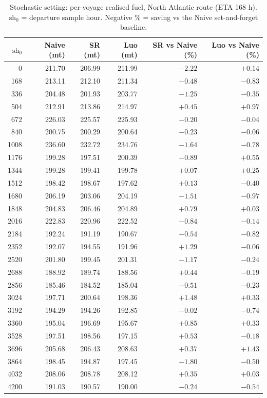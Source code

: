 \documentclass[review,authoryear]{elsarticle}
\begin{document}
\begin{table}[H]
\centering
\caption{Stochastic setting: per-voyage realised fuel, North Atlantic route (ETA 168 h). $\mathrm{sh}_0$ =
departure sample hour. Negative \% = saving vs the Naive set-and-forget baseline.}
\label{tab:stoch-r2}
\begin{tabular}{rrrrrr}
\toprule
$\mathrm{sh}_0$ & Naive (mt) & SR (mt) & Luo (mt) & SR vs Naive (\%) & Luo vs Naive (\%) \\
\midrule
0    & 211.70 & 206.99 & 211.99 & $-2.22$ & $+0.14$ \\
168  & 213.11 & 212.10 & 211.34 & $-0.48$ & $-0.83$ \\
336  & 204.48 & 201.93 & 203.77 & $-1.25$ & $-0.35$ \\
504  & 212.91 & 213.86 & 214.97 & $+0.45$ & $+0.97$ \\
672  & 226.03 & 225.57 & 225.93 & $-0.20$ & $-0.04$ \\
840  & 200.75 & 200.29 & 200.64 & $-0.23$ & $-0.06$ \\
1008 & 236.60 & 232.72 & 234.76 & $-1.64$ & $-0.78$ \\
1176 & 199.28 & 197.51 & 200.39 & $-0.89$ & $+0.55$ \\
1344 & 199.28 & 199.41 & 199.78 & $+0.07$ & $+0.25$ \\
1512 & 198.42 & 198.67 & 197.62 & $+0.13$ & $-0.40$ \\
1680 & 206.19 & 203.06 & 204.19 & $-1.51$ & $-0.97$ \\
1848 & 204.83 & 206.46 & 204.89 & $+0.79$ & $+0.03$ \\
2016 & 222.83 & 220.96 & 222.52 & $-0.84$ & $-0.14$ \\
2184 & 192.24 & 191.19 & 190.67 & $-0.54$ & $-0.82$ \\
2352 & 192.07 & 194.55 & 191.96 & $+1.29$ & $-0.06$ \\
2520 & 201.80 & 199.45 & 201.31 & $-1.17$ & $-0.24$ \\
2688 & 188.92 & 189.74 & 188.56 & $+0.44$ & $-0.19$ \\
2856 & 185.46 & 184.52 & 185.04 & $-0.51$ & $-0.23$ \\
3024 & 197.71 & 200.64 & 198.36 & $+1.48$ & $+0.33$ \\
3192 & 194.29 & 194.26 & 192.85 & $-0.02$ & $-0.74$ \\
3360 & 195.04 & 196.69 & 195.67 & $+0.85$ & $+0.33$ \\
3528 & 197.51 & 198.56 & 197.15 & $+0.53$ & $-0.18$ \\
3696 & 205.68 & 206.43 & 208.63 & $+0.37$ & $+1.43$ \\
3864 & 198.45 & 194.87 & 197.45 & $-1.80$ & $-0.50$ \\
4032 & 208.06 & 208.78 & 208.12 & $+0.35$ & $+0.03$ \\
4200 & 191.03 & 190.57 & 190.00 & $-0.24$ & $-0.54$ \\
\bottomrule
\end{tabular}
\end{table}
\end{document}
